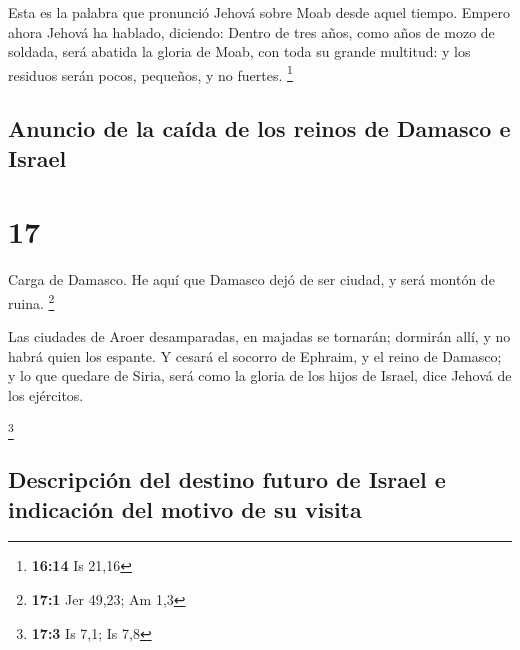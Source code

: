  Esta es la palabra que pronunció Jehová sobre Moab desde
aquel tiempo.  Empero ahora Jehová ha hablado, diciendo:
Dentro de tres años, como años de mozo de soldada, será abatida la
gloria de Moab, con toda su grande multitud: y los residuos serán pocos,
pequeños, y no fuertes. \footnote{\textbf{16:14} Is 21,16}

\hypertarget{anuncio-de-la-cauxedda-de-los-reinos-de-damasco-e-israel}{%
\subsection{Anuncio de la caída de los reinos de Damasco e
Israel}\label{anuncio-de-la-cauxedda-de-los-reinos-de-damasco-e-israel}}

\hypertarget{section-16}{%
\section{17}\label{section-16}}

 Carga de Damasco. He aquí que Damasco dejó de ser ciudad,
y será montón de ruina. \footnote{\textbf{17:1} Jer 49,23; Am 1,3}

 Las ciudades de Aroer desamparadas, en majadas se
tornarán; dormirán allí, y no habrá quien los espante.  Y
cesará el socorro de Ephraim, y el reino de Damasco; y lo que quedare de
Siria, será como la gloria de los hijos de Israel, dice Jehová de los
ejércitos.

\footnote{\textbf{17:3} Is 7,1; Is 7,8}

\hypertarget{descripciuxf3n-del-destino-futuro-de-israel-e-indicaciuxf3n-del-motivo-de-su-visita}{%
\subsection{Descripción del destino futuro de Israel e indicación del
motivo de su
visita}\label{descripciuxf3n-del-destino-futuro-de-israel-e-indicaciuxf3n-del-motivo-de-su-visita}}

